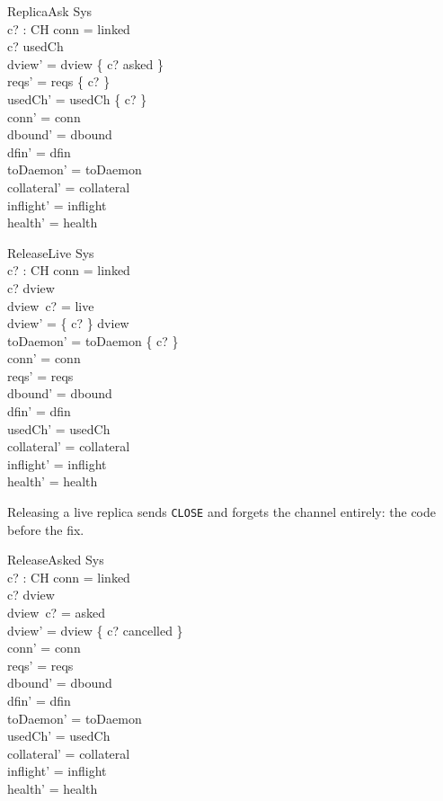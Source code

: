 \documentclass[a4paper,10pt,fleqn]{article}
\begin{document}
\begin{schema}{ReplicaAsk}
  \Delta Sys \\
  c? : CH
\where
  conn = linked \\
  c? \notin usedCh \\
  dview' = dview \cup \{ c? \mapsto asked \} \\
  reqs' = reqs \cup \{ c? \} \\
  usedCh' = usedCh \cup \{ c? \} \\
  conn' = conn \\
  dbound' = dbound \\
  dfin' = dfin \\
  toDaemon' = toDaemon \\
  collateral' = collateral \\
  inflight' = inflight \\
  health' = health
\end{schema}

\begin{schema}{ReleaseLive}
  \Delta Sys \\
  c? : CH
\where
  conn = linked \\
  c? \in \dom dview \\
  dview~c? = live \\
  dview' = \{ c? \} \ndres dview \\
  toDaemon' = toDaemon \cup \{ c? \} \\
  conn' = conn \\
  reqs' = reqs \\
  dbound' = dbound \\
  dfin' = dfin \\
  usedCh' = usedCh \\
  collateral' = collateral \\
  inflight' = inflight \\
  health' = health
\end{schema}

Releasing a live replica sends \texttt{CLOSE} and forgets the channel
entirely: the code before the fix.

\begin{schema}{ReleaseAsked}
  \Delta Sys \\
  c? : CH
\where
  conn = linked \\
  c? \in \dom dview \\
  dview~c? = asked \\
  dview' = dview \oplus \{ c? \mapsto cancelled \} \\
  conn' = conn \\
  reqs' = reqs \\
  dbound' = dbound \\
  dfin' = dfin \\
  toDaemon' = toDaemon \\
  usedCh' = usedCh \\
  collateral' = collateral \\
  inflight' = inflight \\
  health' = health
\end{schema}
\end{document}

